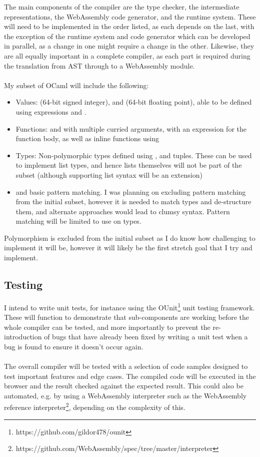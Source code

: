 	The main components of the compiler are the type checker, the intermediate representations, the WebAssembly code generator, and the runtime system. These will need to be implemented in the order listed, as each depends on the last, with the exception of the runtime system and code generator which can be developed in parallel, as a change in one might require a change in the other. Likewise, they are all equally important in a complete compiler, as each part is required during the translation from AST through to a WebAssembly module.
	\\\\
	My subset of OCaml will include the following:
	\begin{itemize}
		\item Values:  (64-bit signed integer),  and  (64-bit floating point), able to be defined using expressions  and .
		\item Functions:  and  with multiple curried arguments, with an expression for the function body, as well as inline functions using 
		\item Types: Non-polymorphic types defined using , and tuples. These can be used to implement list types, and hence lists themselves will not be part of the subset (although supporting list syntax will be an extension)
		\item {} and basic pattern matching. I was planning on excluding pattern matching from the initial subset, however it is needed to match types and de-structure them, and alternate approaches would lead to clumsy syntax. Pattern matching will be limited to use on types.
	\end{itemize}
	Polymorphism is excluded from the initial subset as I do know how challenging to implement it will be, however it will likely be the first stretch goal that I try and implement.

	\subsection*{Testing}
	I intend to write unit tests, for instance using the OUnit\footnote{https://github.com/gildor478/ounit} unit testing framework. These will function to demonstrate that sub-components are working before the whole compiler can be tested, and more importantly to prevent the re-introduction of bugs that have already been fixed by writing a unit test when a bug is found to ensure it doesn't occur again.
	\\\\
	The overall compiler will be tested with a selection of code samples designed to test important features and edge cases. The compiled code will be executed in the browser and the result checked against the expected result. This could also be automated, e.g. by using a WebAssembly interpreter such as the WebAssembly reference interpreter\footnote{https://github.com/WebAssembly/spec/tree/master/interpreter}, depending on the complexity of this.
	
